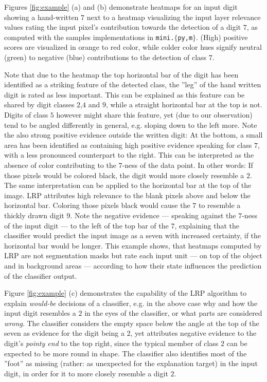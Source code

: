 \documentclass[a4wide]{article}
\begin{document}
Figures \ref{fig:example} (a) and (b) demonstrate heatmaps for an input digit showing a hand-written $7$ next to a heatmap visualizing the input layer relevance values rating the input pixel's contribution towards the detection of a digit $7$, as computed with the samples implementations in  \texttt{mini.$\lbrace$py,m$\rbrace$}. (High) positive scores are visualized in orange to red color, while colder color hues signify neutral (green) to negative (blue) contributions to the detection of class $7$.

Note that due to the heatmap the top horizontal bar of the digit has been identified as a striking feature of the detected class, the ''leg'' of the hand written digit is rated as less important. This can be explained as this feature can be shared by digit classes $2$,$4$ and $9$, while a straight horizontal bar at the top is not. Digits of class $5$ however might share this feature, yet (due to our observation) tend to be angled differently in general, e.g. sloping down to the left more.  Note the also strong positive evidence outside the written digit: At the bottom, a small area has been identified as containing high positive evidence speaking for class $7$, with a less pronounced counterpart to the right. This can be interpreted as the absence of color contributing to the $7$-ness of the data point. In other words: If those pixels would be colored black, the digit would more closely resemble a $2$. The same interpretation can be applied to the horizontal bar at the top of the image. LRP attributes high relevance to the blank pixels above and below the horizontal bar. Coloring those pixels black would cause the $7$ to resemble a thickly drawn digit $9$. Note the negative evidence --- speaking against the $7$-ness of the input digit --- to the left of the top bar of the $7$, explaining that the classifier would predict the input image as a seven with increased certainty, if the horizontal bar would be longer. This example shows, that heatmaps computed by LRP are not segmentation masks but rate each input unit --- on top of the object and in background areas --- according to how their state influences the prediction of the classifier output.

Figure \ref{fig:example} (c) demonstrates the capability of the LRP algorithm to explain \emph{would-be} decisions of a classifier, e.g. in the above case why and how the input digit resembles a $2$ in the eyes of the classifier, or what parts are considered \emph{wrong}. The classifier considers the empty space below the angle at the top of the seven as evidence for the digit being a $2$, yet attributes negative evidence to the digit's \emph{pointy end} to the top right, since the typical member of class $2$ can be expected to be more round in shape. The classifier also identifies most of the ''foot'' as missing (rather: as unexpected for the explanation target) in the input digit, in order for it to more closely resemble a digit $2$.
\end{document}
